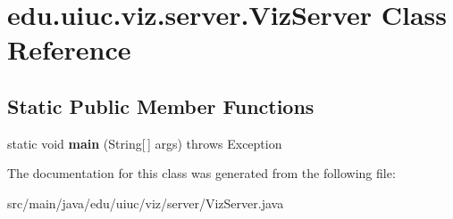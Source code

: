 \hypertarget{classedu_1_1uiuc_1_1viz_1_1server_1_1_viz_server}{}\section{edu.\+uiuc.\+viz.\+server.\+Viz\+Server Class Reference}
\label{classedu_1_1uiuc_1_1viz_1_1server_1_1_viz_server}
\subsection*{Static Public Member Functions}
\begin{DoxyCompactItemize}
\item 
\mbox{\label{classedu_1_1uiuc_1_1viz_1_1server_1_1_viz_server_ad272c1245e557004c045df072621086e}} 
static void {\bfseries main} (String\mbox{[}$\,$\mbox{]} args)  throws Exception 
\end{DoxyCompactItemize}


The documentation for this class was generated from the following file\+:\begin{DoxyCompactItemize}
\item 
src/main/java/edu/uiuc/viz/server/Viz\+Server.\+java\end{DoxyCompactItemize}
